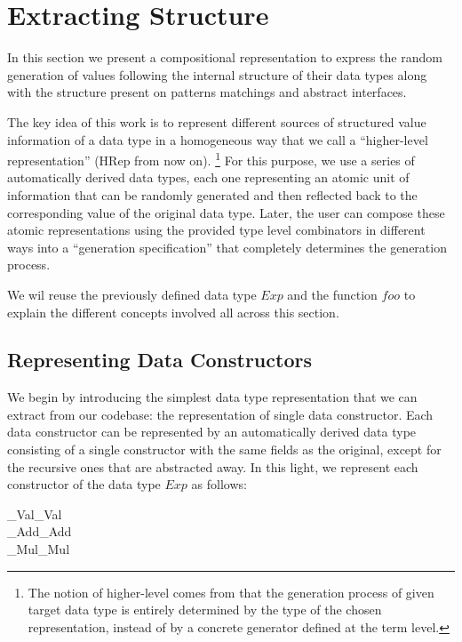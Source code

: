 \documentclass[conference, fleqn]{IEEEtran}
\newcommand{\Conid}[1]{\mathit{#1}}
\newcommand{\Varid}[1]{\mathit{#1}}
\def\resethooks{%
  \global\let\SaveRestoreHook\empty
  \global\let\ColumnHook\empty}
\let\hspre\empty
\let\hspost\empty
\begin{document}
\section{Extracting Structure} \label{sec:hrep}

In this section we present a compositional representation to express the random
generation of values following the internal structure of their data types along
with the structure present on patterns matchings and abstract interfaces.


The key idea of this work is to represent different sources of structured value
information of a data type in a homogeneous way that we call a ``higher-level
representation'' (\ensuremath{\text{HRep}} from now on).%
\footnote{The notion of higher-level comes from that the generation process of
  given target data type is entirely determined by the type of the chosen
  representation, instead of by a concrete generator defined at the term level.}
%
For this purpose, we use a series of automatically derived data types, each one
representing an atomic unit of information that can be randomly generated and
then reflected back to the corresponding value of the original data type.
%
Later, the user can compose these atomic representations using the provided type
level combinators in different ways into a ``generation specification'' that
completely determines the generation process.


We wil reuse the previously defined data type \ensuremath{\Conid{Exp}} and the function \ensuremath{\Varid{foo}} to
explain the different concepts involved all across this section.


\subsection*{\textbf{Representing Data Constructors}}

We begin by introducing the simplest data type representation that we can
extract from our codebase: the representation of single data constructor.
%
Each data constructor can be represented by an automatically derived data type
consisting of a single constructor with the same fields as the original, except
for the recursive ones that are abstracted away.
%
In this light, we represent each constructor of the data type \ensuremath{\Conid{Exp}} as follows:

\begin{hscode}\SaveRestoreHook
\column{B}{@{}>{\hspre}l<{\hspost}@{}}%
\column{16}{@{}>{\hspre}l<{\hspost}@{}}%
\column{E}{@{}>{\hspre}l<{\hspost}@{}}%
\>[B]{}\;_{Val}\;{}\<[16]%
\>[16]{}\Varid{r}\mathrel{=}_{Val}\;\Conid{Int}{}\<[E]%
\\
\>[B]{}\;_{Add}\;{}\<[16]%
\>[16]{}\Varid{r}\mathrel{=}_{Add}\;\Varid{r}\;\Varid{r}{}\<[E]%
\\
\>[B]{}\;_{Mul}\;{}\<[16]%
\>[16]{}\Varid{r}\mathrel{=}_{Mul}\;\Varid{r}\;\Varid{r}{}\<[E]%
\ColumnHook
\end{hscode}\resethooks
\end{document}
